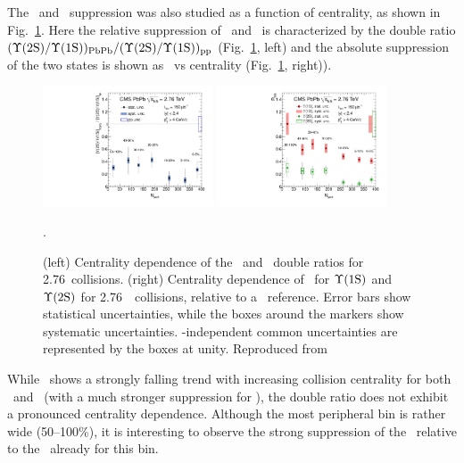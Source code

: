 The \PgUa\ and \PgUb\ suppression was also studied as a function of centrality,
as shown in Fig.~\ref{fig:GR:centrality}.
Here the relative suppression of \PgUa\ and \PgUb\ is characterized by
the double ratio \linebreak $({\Upsilon\mathrm{(2S)}/\Upsilon\mathrm{(1S)}})_{\rm PbPb}/({\Upsilon\mathrm{(2S)}/\Upsilon\mathrm{(1S)}})_{\rm pp}$
(Fig.~\ref{fig:GR:centrality}, left) and the absolute suppression
of the two states is shown as \Raa\ vs centrality (Fig.~\ref{fig:GR:centrality}, right)).

\begin{figure}[t]
\begin{center}
   \includegraphics[width=0.45\textwidth]{qqbarfigures/chi2VsCent}
   \includegraphics[width=0.45\textwidth]{qqbarfigures/RaaPt4}
  \caption{(left) Centrality dependence of the \PgUa\ and \PgUb\ double ratios
for 2.76\TeV\ collisions.  (right) Centrality dependence of \Raa\ 
for $\Upsilon\mathrm{(1S)}$ and $\Upsilon\mathrm{(2S)}$ for 2.76\TeV\ \PbPb\ collisions, relative to a \pp\ reference.
Error bars show statistical uncertainties, while the boxes around the markers
show systematic uncertainties. \npart-independent
common uncertainties are represented by the boxes at unity. Reproduced from~\cite{Chatrchyan:2012lxa}}.
\label{fig:GR:centrality}
\end{center}
\end{figure}

While \Raa\ shows a strongly falling trend with increasing collision centrality
for both \PgUa\ and \PgUb\ (with a much stronger suppression for \PgUb), the
double ratio does not exhibit a pronounced centrality dependence.
Although the most peripheral bin
is rather wide (50--100\%), it is interesting to observe the strong suppression of the
\PgUb\ relative to the \PgUa\ already for this bin. 


